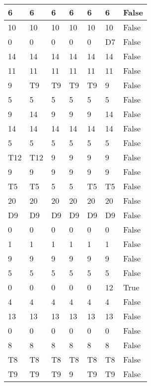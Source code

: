 \begin{longtable}[htbp]{| p{} | p{} | p{}| p{}| p{}| p{}| p{}|}
6 & 6 & 6 & 6 & 6 & 6 & False \\ \hline
10 & 10 & 10 & 10 & 10 & 10 & False \\ \hline
0 & 0 & 0 & 0 & 0 & \multicolumn{1}{l|}{D7} & False \\ \hline
14 & 14 & 14 & 14 & 14 & 14 & False \\ \hline
11 & 11 & 11 & 11 & 11 & 11 & False \\ \hline
9 & \multicolumn{1}{l|}{T9} & \multicolumn{1}{l|}{T9} & \multicolumn{1}{l|}{T9} & \multicolumn{1}{l|}{T9} & 9 & False \\ \hline
5 & 5 & 5 & 5 & 5 & 5 & False \\ \hline
9 & 14 & 9 & 9 & 9 & 14 & False \\ \hline
14 & 14 & 14 & 14 & 14 & 14 & False \\ \hline
5 & 5 & 5 & 5 & 5 & 5 & False \\ \hline
\multicolumn{1}{|l|}{T12} & \multicolumn{1}{l|}{T12} & 9 & 9 & 9 & 9 & False \\ \hline
9 & 9 & 9 & 9 & 9 & 9 & False \\ \hline
\multicolumn{1}{|l|}{T5} & \multicolumn{1}{l|}{T5} & 5 & 5 & \multicolumn{1}{l|}{T5} & \multicolumn{1}{l|}{T5} & False \\ \hline
20 & 20 & 20 & 20 & 20 & 20 & False \\ \hline
\multicolumn{1}{|l|}{D9} & \multicolumn{1}{l|}{D9} & \multicolumn{1}{l|}{D9} & \multicolumn{1}{l|}{D9} & \multicolumn{1}{l|}{D9} & \multicolumn{1}{l|}{D9} & False \\ \hline
0 & 0 & 0 & 0 & 0 & 0 & False \\ \hline
1 & 1 & 1 & 1 & 1 & 1 & False \\ \hline
9 & 9 & 9 & 9 & 9 & 9 & False \\ \hline
5 & 5 & 5 & 5 & 5 & 5 & False \\ \hline
0 & 0 & 0 & 0 & 0 & 12 & True \\ \hline
4 & 4 & 4 & 4 & 4 & 4 & False \\ \hline
13 & 13 & 13 & 13 & 13 & 13 & False \\ \hline
0 & 0 & 0 & 0 & 0 & 0 & False \\ \hline
8 & 8 & 8 & 8 & 8 & 8 & False \\ \hline
\multicolumn{1}{|l|}{T8} & \multicolumn{1}{l|}{T8} & \multicolumn{1}{l|}{T8} & \multicolumn{1}{l|}{T8} & \multicolumn{1}{l|}{T8} & \multicolumn{1}{l|}{T8} & False \\ \hline
\multicolumn{1}{|l|}{T9} & \multicolumn{1}{l|}{T9} & \multicolumn{1}{l|}{T9} & 9 & \multicolumn{1}{l|}{T9} & \multicolumn{1}{l|}{T9} & False \\ \hline

\end{longtable}
